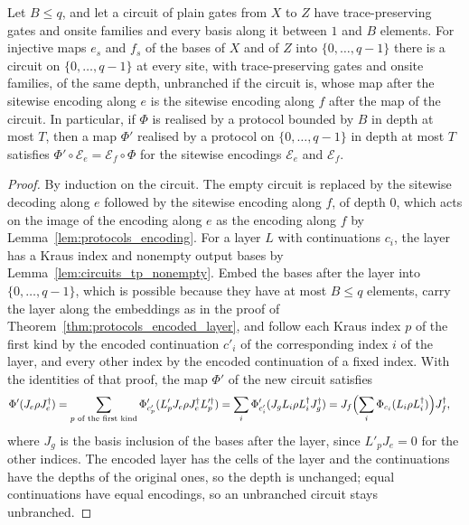 \begin{theorem}
    \label{thm:protocols_encoded_circuit}
    \leanok
    Let $B\le q$, and let a circuit of plain gates from $X$ to $Z$ have trace-preserving gates
    and onsite families and every basis along it between $1$ and $B$ elements. For injective
    maps $e_s$ and $f_s$ of the bases of $X$ and of $Z$ into $\{0,\dots,q-1\}$ there is a
    circuit on $\{0,\dots,q-1\}$ at every site, with trace-preserving gates and onsite
    families, of the same depth, unbranched if the circuit is, whose map after the sitewise
    encoding along $e$ is the sitewise encoding along $f$ after the map of the circuit. In
    particular, if $\Phi$ is realised by a protocol bounded by $B$ in depth at most $T$, then a
    map $\Phi'$ realised by a protocol on $\{0,\dots,q-1\}$ in depth at most $T$ satisfies
    $\Phi'\circ\mathcal E_e=\mathcal E_f\circ\Phi$ for the sitewise encodings $\mathcal E_e$
    and $\mathcal E_f$.
\end{theorem}
\begin{proof}\leanok
    By induction on the circuit. The empty circuit is replaced by the sitewise decoding along
    $e$ followed by the sitewise encoding along $f$, of depth $0$, which acts on the image of
    the encoding along $e$ as the encoding along $f$ by Lemma~\ref{lem:protocols_encoding}.
    For a layer $L$ with continuations $c_i$, the layer has a Kraus index and nonempty output
    bases by Lemma~\ref{lem:circuits_tp_nonempty}. Embed the bases after the layer into
    $\{0,\dots,q-1\}$, which is possible because they have at most $B\le q$ elements, carry
    the layer along the embeddings as in the proof of
    Theorem~\ref{thm:protocols_encoded_layer}, and follow each Kraus index $p$ of the first kind
    by the encoded continuation $c'_i$ of the corresponding index $i$ of the layer, and every
    other index by the encoded continuation of a fixed index. With the identities of that
    proof, the map $\Phi'$ of the new circuit satisfies
    \begin{align}
        \Phi'(J_e\rho J_e^\dagger)
        &=\sum_{p\text{ of the first kind}}\Phi'_{c'_p}(L'_pJ_e\rho J_e^\dagger L_p'^\dagger)
        =\sum_i\Phi'_{c'_i}(J_gL_i\rho L_i^\dagger J_g^\dagger)
        =J_f\Bigl(\sum_i\Phi_{c_i}(L_i\rho L_i^\dagger)\Bigr)J_f^\dagger,
        \notag
    \end{align}
    where $J_g$ is the basis inclusion of the bases after the layer, since $L'_pJ_e=0$ for the
    other indices. The encoded layer has the
    cells of the layer and the continuations have the depths of the original ones, so the
    depth is unchanged; equal continuations have equal encodings, so an unbranched circuit stays
    unbranched.
\end{proof}

